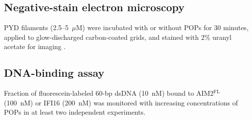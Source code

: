 \documentclass[11pt]{article}
\begin{document}
\subsection{Negative-stain electron microscopy}
PYD filaments (2.5--5~$\mu$M) were incubated with or without POPs for 30 minutes, applied to glow-discharged carbon-coated grids, and stained with 2\% uranyl acetate for imaging \citep{matyszewski2019}.

\subsection{DNA-binding assay}
Fraction of fluorescein-labeled 60-bp dsDNA (10~nM) bound to AIM2$^{\text{FL}}$ (100~nM) or IFI16 (200~nM) was monitored with increasing concentrations of POPs in at least two independent experiments.



\end{document}

